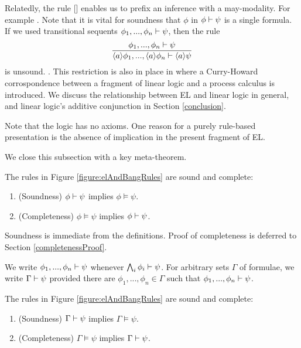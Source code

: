Relatedly, the rule [] enables us to
prefix an inference with a may-modality. For example . Note that it is vital for soundness that $\phi$ in $\phi
\vdash \psi$ is a single formula. If we used transitional sequents $\phi_1, ..., \phi_n \vdash \psi$,
then the rule
\[
   \frac{\displaystyle{ 
     \phi_1, ..., \phi_n \vdash\psi
    }}{\displaystyle{ 
     \langle a \rangle \phi_1, ..., \langle a \rangle \phi_n \vdash\langle a \rangle \psi
    }}
\]
is unsound. . This
restriction is also in place in \cite{GaySJ:typcalosp} where a
Curry-Howard corrospondence between a fragment of linear logic
\cite{GirardJY:linlog,GirardJY:protyp} and a process calculus is
introduced. We discuss the relationship between EL and linear logic in
general, and linear logic's additive conjunction in Section
\ref{conclusion}.

Note that the logic has no axioms. One reason for a purely rule-based
presentation is the absence of implication in the present fragment of
EL. 

We close this subsection with a key meta-theorem.

\begin{theorem}\label{theorem:elAndBang:soundComplete}
The rules in Figure \ref{figure:elAndBangRules} are sound and complete:
\begin{enumerate}

\item\label{theorem:elAndBang:sound} (Soundness) $\phi \vdash \psi$ implies $\phi \models \psi$.

\item\label{theorem:elAndBang:complete} (Completeness) $\phi \models \psi$ implies $\phi \vdash \psi$.

\end{enumerate}
\end{theorem}

\NI Soundness is immediate from the definitions. Proof of completeness is
deferred to Section \ref{completenessProof}. 

\begin{definition}
We write $\phi_1, ...,
\phi_n \vdash \psi$ whenever $\bigwedge_{i}\phi_i \vdash \psi$.  For
arbitrary sets $\Gamma$ of formulae, we write $\Gamma \vdash \psi$
provided there are $\phi_1, ..., \phi_n \in \Gamma$ such that $\phi_1,
..., \phi_n \vdash \psi$.
\end{definition}

\begin{corollary}
The rules in Figure \ref{figure:elAndBangRules} are sound and complete:
\begin{enumerate}

\item(Soundness) $\Gamma \vdash \psi$ implies $\Gamma \models \psi$.

\item (Completeness) $\Gamma \models \psi$ implies $\Gamma \vdash \psi$.

\end{enumerate}
\end{corollary}

